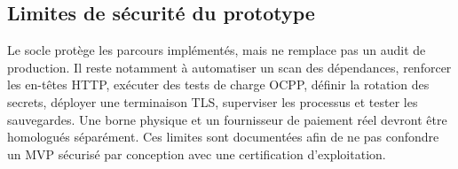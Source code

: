 \subsection{Limites de sécurité du prototype}

Le socle protège les parcours implémentés, mais ne remplace pas un audit de
production. Il reste notamment à automatiser un scan des dépendances, renforcer les
en-têtes HTTP, exécuter des tests de charge OCPP, définir la rotation des secrets,
déployer une terminaison TLS, superviser les processus et tester les sauvegardes.
Une borne physique et un fournisseur de paiement réel devront être homologués
séparément. Ces limites sont documentées afin de ne pas confondre un MVP sécurisé
par conception avec une certification d'exploitation.
